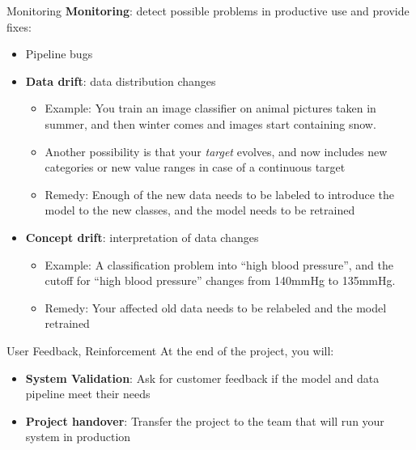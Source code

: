 \documentclass[ignorenonframetext,]{beamer}
\providecommand{\tightlist}{%
  \setlength{\itemsep}{0pt}\setlength{\parskip}{0pt}}
\begin{document}
\begin{frame}{Monitoring}
\label{monitoring}
\textbf{Monitoring}: detect possible problems in productive use and provide fixes:

\begin{itemize}
\tightlist
    \item Pipeline bugs
    \item \textbf{Data drift}: data distribution changes
    \begin{itemize}
    \tightlist
        \item Example: You train an image classifier on animal pictures taken in
    summer, and then winter comes and images start containing snow.
    \item Another possibility is that your \emph{target} evolves, and now
  includes new categories or new value ranges in case of a continuous
  target
  \item Remedy: Enough of the new data needs to be labeled to introduce the
  model to the new classes, and the model needs to be retrained
    \end{itemize}
    \item \textbf{Concept drift}: interpretation of data changes
    \begin{itemize}
    \tightlist
        \item Example: A classification problem into “high blood pressure”, and the cutoff
for “high blood pressure” changes from 140mmHg to 135mmHg.
        \item Remedy: Your affected old data needs to be relabeled and the model retrained
    \end{itemize}
\end{itemize}

\end{frame}



\begin{frame}{User Feedback, Reinforcement}
\label{user-feedback-and-acceptance}
At the end of the project, you will:
\begin{itemize}
\tightlist
    \item \textbf{System Validation}: Ask for customer feedback if the model
    and data pipeline meet their needs
    \item \textbf{Project handover}: Transfer the project to the team that
    will run your system in production
\end{itemize}
\end{frame}
\end{document}
